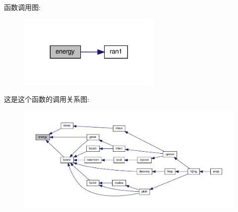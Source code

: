 函数调用图\+:
\nopagebreak
\begin{figure}[H]
\begin{center}
\leavevmode
\includegraphics[width=197pt]{energy_8f90_aa09f690b751989fd1445ea720333253a_cgraph}
\end{center}
\end{figure}
这是这个函数的调用关系图\+:
\nopagebreak
\begin{figure}[H]
\begin{center}
\leavevmode
\includegraphics[width=350pt]{energy_8f90_aa09f690b751989fd1445ea720333253a_icgraph}
\end{center}
\end{figure}
